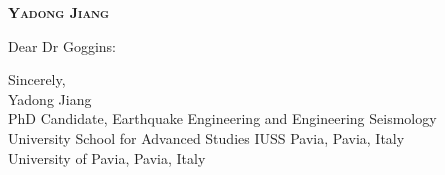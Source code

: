 \documentclass{article}
\begin{document}
\begin{center}

    \Large\selectfont
    \textbf{\textsc{Yadong Jiang}}\\
    
    \normalsize\selectfont
    
    
    
\end{center}
\par


\normalsize\selectfont


\par
\vspace{15pt}

\large\selectfont

Dear Dr Goggins:
\par

\par
Sincerely,\\
Yadong Jiang\\
PhD Candidate, Earthquake Engineering and Engineering Seismology\\
University School for Advanced Studies IUSS Pavia, Pavia, Italy\\
University of Pavia, Pavia, Italy
\end{document}

